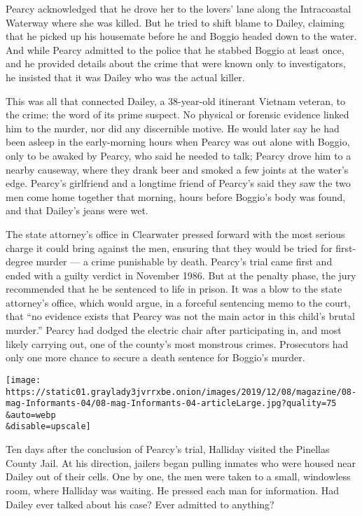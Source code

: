 Pearcy acknowledged that he drove her to the lovers' lane along the
Intracoastal Waterway where she was killed. But he tried to shift blame
to Dailey, claiming that he picked up his housemate before he and Boggio
headed down to the water. And while Pearcy admitted to the police that
he stabbed Boggio at least once, and he provided details about the crime
that were known only to investigators, he insisted that it was Dailey
who was the actual killer.

This was all that connected Dailey, a 38-year-old itinerant Vietnam
veteran, to the crime: the word of its prime suspect. No physical or
forensic evidence linked him to the murder, nor did any discernible
motive. He would later say he had been asleep in the early-morning hours
when Pearcy was out alone with Boggio, only to be awaked by Pearcy, who
said he needed to talk; Pearcy drove him to a nearby causeway, where
they drank beer and smoked a few joints at the water's edge. Pearcy's
girlfriend and a longtime friend of Pearcy's said they saw the two men
come home together that morning, hours before Boggio's body was found,
and that Dailey's jeans were wet.

The state attorney's office in Clearwater pressed forward with the most
serious charge it could bring against the men, ensuring that they would
be tried for first-degree murder --- a crime punishable by death.
Pearcy's trial came first and ended with a guilty verdict in November
1986. But at the penalty phase, the jury recommended that he be
sentenced to life in prison. It was a blow to the state attorney's
office, which would argue, in a forceful sentencing memo to the court,
that ``no evidence exists that Pearcy was not the main actor in this
child's brutal murder.'' Pearcy had dodged the electric chair after
participating in, and most likely carrying out, one of the county's most
monstrous crimes. Prosecutors had only one more chance to secure a death
sentence for Boggio's murder.

\texttt{[image: https://static01.graylady3jvrrxbe.onion/images/2019/12/08/magazine/08-mag-Informants-04/08-mag-Informants-04-articleLarge.jpg?quality=75\\\&auto=webp\\\&disable=upscale]}

Ten days after the conclusion of Pearcy's trial, Halliday visited the
Pinellas County Jail. At his direction, jailers began pulling inmates
who were housed near Dailey out of their cells. One by one, the men were
taken to a small, windowless room, where Halliday was waiting. He
pressed each man for information. Had Dailey ever talked about his case?
Ever admitted to anything?

